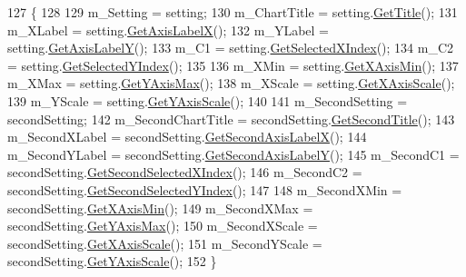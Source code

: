 \begin{DoxyCode}
127                                                                         \{
128         
129         m\_Setting = setting;
130         m\_ChartTitle = setting.\hyperlink{class_data_attribute_ade9747a192ba22fe1020e874bff6a48c}{GetTitle}();
131         m\_XLabel = setting.\hyperlink{class_data_attribute_aecb451704a87d77dd80dbad8a19099d1}{GetAxisLabelX}();
132         m\_YLabel = setting.\hyperlink{class_data_attribute_af5f68794cd0195d42135d5e48120ccc0}{GetAxisLabelY}();
133         m\_C1 = setting.\hyperlink{class_data_attribute_a0f4a54973bc44b0526f78bda945dc81b}{GetSelectedXIndex}();
134         m\_C2 = setting.\hyperlink{class_data_attribute_a82e7519853d9f470ea183dd0c39a03d6}{GetSelectedYIndex}();
135         
136         m\_XMin = setting.\hyperlink{class_data_attribute_afa9da883abc4abad5f64c045de114c50}{GetXAxisMin}();
137         m\_XMax = setting.\hyperlink{class_data_attribute_a81243eb8f7008e05e74b0f3571d2f08d}{GetYAxisMax}();
138         m\_XScale = setting.\hyperlink{class_data_attribute_a5a1de25600487aa958a19ce01151fea4}{GetXAxisScale}();
139         m\_YScale = setting.\hyperlink{class_data_attribute_a95259727ce91efc0e0eaa28487d944c5}{GetYAxisScale}();
140         
141         m\_SecondSetting = secondSetting;
142         m\_SecondChartTitle = secondSetting.\hyperlink{class_data_attribute_a4079522c93025fce7569eaed585f4aeb}{GetSecondTitle}();
143         m\_SecondXLabel = secondSetting.\hyperlink{class_data_attribute_a8ace4cb1fee9e2abeabe3efc9a190c8f}{GetSecondAxisLabelX}();
144         m\_SecondYLabel = secondSetting.\hyperlink{class_data_attribute_a6efb7e067317898feefbbf6bd472b998}{GetSecondAxisLabelY}();
145         m\_SecondC1 = secondSetting.\hyperlink{class_data_attribute_a7f501790eee650ddf9ac17c4f63a3995}{GetSecondSelectedXIndex}();
146         m\_SecondC2 = secondSetting.\hyperlink{class_data_attribute_a6f61ad05915f4aa31ad3dba00596da64}{GetSecondSelectedYIndex}();
147         
148         m\_SecondXMin = secondSetting.\hyperlink{class_data_attribute_afa9da883abc4abad5f64c045de114c50}{GetXAxisMin}();
149         m\_SecondXMax = secondSetting.\hyperlink{class_data_attribute_a81243eb8f7008e05e74b0f3571d2f08d}{GetYAxisMax}();
150         m\_SecondXScale = secondSetting.\hyperlink{class_data_attribute_a5a1de25600487aa958a19ce01151fea4}{GetXAxisScale}();
151         m\_SecondYScale = secondSetting.\hyperlink{class_data_attribute_a95259727ce91efc0e0eaa28487d944c5}{GetYAxisScale}();
152     \}
\end{DoxyCode}


